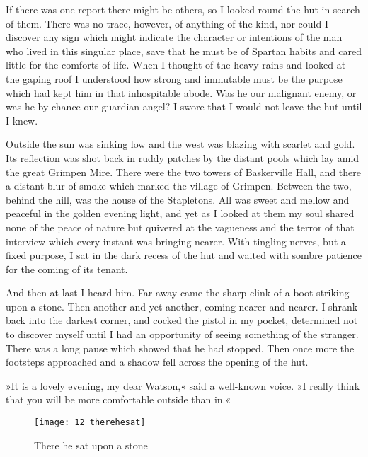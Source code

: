 If there was one report there might be others, so I looked round the hut in search of them. There was no trace, however, of anything of the kind, nor could I discover any sign which might indicate the character or intentions of the man who lived in this singular place, save that he must be of Spartan habits and cared little for the comforts of life. When I thought of the heavy rains and looked at the gaping roof I understood how strong and immutable must be the purpose which had kept him in that inhospitable abode. Was he our malignant enemy, or was he by chance our guardian angel? I swore that I would not leave the hut until I knew.

Outside the sun was sinking low and the west was blazing with scarlet and gold. Its reflection was shot back in ruddy patches by the distant pools which lay amid the great Grimpen Mire. There were the two towers of Baskerville Hall, and there a distant blur of smoke which marked the village of Grimpen. Between the two, behind the hill, was the house of the Stapletons. All was sweet and mellow and peaceful in the golden evening light, and yet as I looked at them my soul shared none of the peace of nature but quivered at the vagueness and the terror of that interview which every instant was bringing nearer. With tingling nerves, but a fixed purpose, I sat in the dark recess of the hut and waited with sombre patience for the coming of its tenant.

And then at last I heard him. Far away came the sharp clink of a boot striking upon a stone. Then another and yet another, coming nearer and nearer. I shrank back into the darkest corner, and cocked the pistol in my pocket, determined not to discover myself until I had an opportunity of seeing something of the stranger. There was a long pause which showed that he had stopped. Then once more the footsteps approached and a shadow fell across the opening of the hut.

»It is a lovely evening, my dear Watson,« said a well-known voice. »I really think that you will be more comfortable outside than in.«

\clearpage
\newpage
\vfill
\begin{figure}[tbph]
\centering
\texttt{[image: 12\_therehesat]}
\caption{There he sat upon a stone}
\end{figure}
\vfill
\thispagestyle{empty}
\clearpage